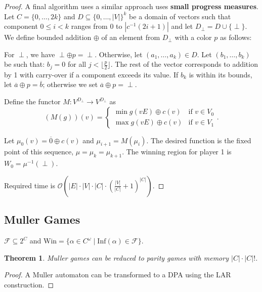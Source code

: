 \documentclass{article}
\newtheorem{theorem}{Theorem}
\begin{document}
\begin{proof}
	A final algorithm uses a similar approach uses \textbf{small progress measures}. Let $C = \{0, \dots, 2k\}$ and $D \subseteq \{ 0, \dots, |V| \}^k$ be a domain of vectors such that component $0 \leq i < k$ ranges from $0$ to $|c^{-1}(2i+1)|$ and let $D_\perp = D \cup \{\perp\}$. We define bounded addition $\oplus$ of an element from $D_\perp$ with a color $p$ as follows:
	
	For $\perp$, we have $\perp \oplus p = \perp$. Otherwise, let $(a_1, \dots, a_k) \in D$. Let $(b_1, \dots, b_k)$ be such that: $b_j = 0$ for all $j < \lfloor \frac{p}{2} \rfloor$. The rest of the vector corresponds to addition by 1 with carry-over if a component exceeds its value. If $b_k$ is within its bounds, let $\overline{a} \oplus p = \overline{b}$; otherwise we set $\overline{a} \oplus p = \perp$.
	
	Define the functor $M : V^{D_\perp} \rightarrow V^{D_\perp}$ as
	$$ (M(g))(v) = \begin{cases}
		\min g(vE) \oplus c(v) & \text{if } v \in V_0 \\
		\max g(vE) \oplus c(v) & \text{if } v \in V_1
	\end{cases}. $$
	
	Let $\mu_0(v) = \overline{0} \oplus c(v)$ and $\mu_{i+1} = M(\mu_i)$. The desired function is the fixed point of this sequence, $\mu = \mu_k = \mu_{k+1}$. The winning region for player 1 is $W_0 = \mu^{-1}(\perp)$. 
	
	Required time is $\mathcal{O}\left(|E| \cdot |V| \cdot |C| \cdot (\frac{|V|}{|C|} + 1)^{|C|}\right)$.
\end{proof}

\vspace{1.5cm}
\subsection{Muller Games}
$\mathcal{F} \subseteq 2^C$ and $\text{Win} = \{ \alpha \in C^\omega \mid \text{Inf}(\alpha) \in \mathcal{F} \}$.

\begin{theorem}
	Muller games can be reduced to parity games with memory $|C| \cdot |C|!$.
\end{theorem}
\begin{proof}
	A Muller automaton can be transformed to a DPA using the LAR construction.
\end{proof}
\end{document}
